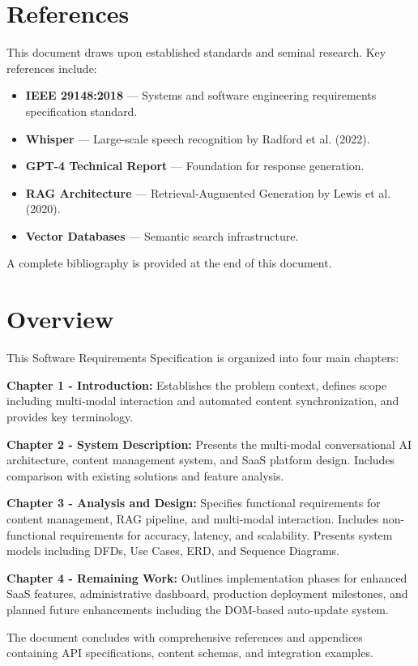 \section{References}

This document draws upon established standards and seminal research. Key references include:

\begin{itemize}[leftmargin=*]
    \item \textbf{IEEE 29148:2018} \cite{ieee29148} --- Systems and software engineering requirements specification standard.
    \item \textbf{Whisper} \cite{whisper} --- Large-scale speech recognition by Radford et al. (2022).
    \item \textbf{GPT-4 Technical Report} \cite{gpt4} --- Foundation for response generation.
    \item \textbf{RAG Architecture} \cite{rag} --- Retrieval-Augmented Generation by Lewis et al. (2020).
    \item \textbf{Vector Databases} \cite{weaviate} --- Semantic search infrastructure.
\end{itemize}

A complete bibliography is provided at the end of this document.

\section{Overview}

This Software Requirements Specification is organized into four main chapters:

\textbf{Chapter 1 - Introduction:} Establishes the problem context, defines scope including multi-modal interaction and automated content synchronization, and provides key terminology.

\textbf{Chapter 2 - System Description:} Presents the multi-modal conversational AI architecture, content management system, and SaaS platform design. Includes comparison with existing solutions and feature analysis.

\textbf{Chapter 3 - Analysis and Design:} Specifies functional requirements for content management, RAG pipeline, and multi-modal interaction. Includes non-functional requirements for accuracy, latency, and scalability. Presents system models including DFDs, Use Cases, ERD, and Sequence Diagrams.

\textbf{Chapter 4 - Remaining Work:} Outlines implementation phases for enhanced SaaS features, administrative dashboard, production deployment milestones, and planned future enhancements including the DOM-based auto-update system.

The document concludes with comprehensive references and appendices containing API specifications, content schemas, and integration examples.
